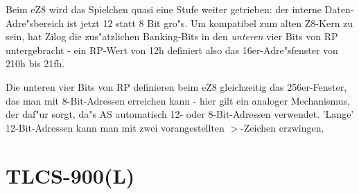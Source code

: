 \documentclass[12pt,a4paper,twoside]{report}
\begin{document}
Beim eZ8 wird das Spielchen quasi eine Stufe weiter getrieben: der
interne Daten-Adre"sbereich ist jetzt 12 statt 8 Bit gro"s.  Um
kompatibel zum alten Z8-Kern zu sein, hat Zilog die zus"atzlichen
Banking-Bits in den {\em unteren} vier Bits von RP untergebracht -
ein RP-Wert von 12h definiert also das 16er-Adre"sfenster von 210h
bis 21fh.

Die unteren vier Bits von RP definieren beim eZ8 gleichzeitig das
256er-Fenster, das man mit 8-Bit-Adressen erreichen kann - hier gilt
ein analoger Mechanismus, der daf"ur sorgt, da"s AS automatisch 12-
oder 8-Bit-Adressen verwendet.  'Lange' 12-Bit-Adressen kann man mit
zwei vorangestellten $>$-Zeichen erzwingen.


\section{TLCS-900(L)}
\label{TLCS900Spec}
\end{document}
